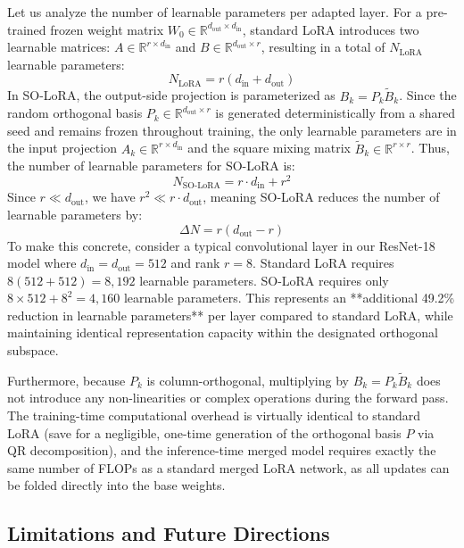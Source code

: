 \documentclass{article}
\theoremstyle{plain}
\theoremstyle{definition}
\theoremstyle{remark}
\begin{document}
Let us analyze the number of learnable parameters per adapted layer. For a pre-trained frozen weight matrix $W_0 \in \mathbb{R}^{d_{\text{out}} \times d_{\text{in}}}$, standard LoRA introduces two learnable matrices: $A \in \mathbb{R}^{r \times d_{\text{in}}}$ and $B \in \mathbb{R}^{d_{\text{out}} \times r}$, resulting in a total of $N_{\text{LoRA}}$ learnable parameters:
\begin{equation}
  N_{\text{LoRA}} = r(d_{\text{in}} + d_{\text{out}})
\end{equation}
In SO-LoRA, the output-side projection is parameterized as $B_k = P_k \tilde{B}_k$. Since the random orthogonal basis $P_k \in \mathbb{R}^{d_{\text{out}} \times r}$ is generated deterministically from a shared seed and remains frozen throughout training, the only learnable parameters are in the input projection $A_k \in \mathbb{R}^{r \times d_{\text{in}}}$ and the square mixing matrix $\tilde{B}_k \in \mathbb{R}^{r \times r}$. Thus, the number of learnable parameters for SO-LoRA is:
\begin{equation}
  N_{\text{SO-LoRA}} = r \cdot d_{\text{in}} + r^2
\end{equation}
Since $r \ll d_{\text{out}}$, we have $r^2 \ll r \cdot d_{\text{out}}$, meaning SO-LoRA reduces the number of learnable parameters by:
\begin{equation}
  \Delta N = r(d_{\text{out}} - r)
\end{equation}
To make this concrete, consider a typical convolutional layer in our ResNet-18 model where $d_{\text{in}} = d_{\text{out}} = 512$ and rank $r = 8$. Standard LoRA requires $8(512 + 512) = 8,192$ learnable parameters. SO-LoRA requires only $8 \times 512 + 8^2 = 4,160$ learnable parameters. This represents an **additional 49.2\% reduction in learnable parameters** per layer compared to standard LoRA, while maintaining identical representation capacity within the designated orthogonal subspace.

Furthermore, because $P_k$ is column-orthogonal, multiplying by $B_k = P_k \tilde{B}_k$ does not introduce any non-linearities or complex operations during the forward pass. The training-time computational overhead is virtually identical to standard LoRA (save for a negligible, one-time generation of the orthogonal basis $P$ via QR decomposition), and the inference-time merged model requires exactly the same number of FLOPs as a standard merged LoRA network, as all updates can be folded directly into the base weights.

\subsection{Limitations and Future Directions}
\label{sec:limitations}
\end{document}
